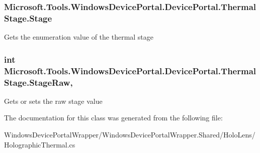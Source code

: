 \subsubsection[{\texorpdfstring{Stage}{Stage}}]{ Microsoft.\+Tools.\+Windows\+Device\+Portal.\+Device\+Portal.\+Thermal\+Stage.\+Stage\hspace{0.3cm}{\ttfamily [get]}}\hypertarget{class_microsoft_1_1_tools_1_1_windows_device_portal_1_1_device_portal_1_1_thermal_stage_a4af4bafc8260dc09236c3a042bc32153}{}\label{class_microsoft_1_1_tools_1_1_windows_device_portal_1_1_device_portal_1_1_thermal_stage_a4af4bafc8260dc09236c3a042bc32153}


Gets the enumeration value of the thermal stage 

\subsubsection[{\texorpdfstring{Stage\+Raw}{StageRaw}}]{\setlength{\rightskip}{0pt plus 5cm}int Microsoft.\+Tools.\+Windows\+Device\+Portal.\+Device\+Portal.\+Thermal\+Stage.\+Stage\+Raw\hspace{0.3cm}{\ttfamily [get]}, {\ttfamily [set]}}\hypertarget{class_microsoft_1_1_tools_1_1_windows_device_portal_1_1_device_portal_1_1_thermal_stage_a91f53f3b50fa9e36fed48aa6c6843b84}{}\label{class_microsoft_1_1_tools_1_1_windows_device_portal_1_1_device_portal_1_1_thermal_stage_a91f53f3b50fa9e36fed48aa6c6843b84}


Gets or sets the raw stage value 



The documentation for this class was generated from the following file\+:\begin{DoxyCompactItemize}
\item 
Windows\+Device\+Portal\+Wrapper/\+Windows\+Device\+Portal\+Wrapper.\+Shared/\+Holo\+Lens/Holographic\+Thermal.\+cs\end{DoxyCompactItemize}
